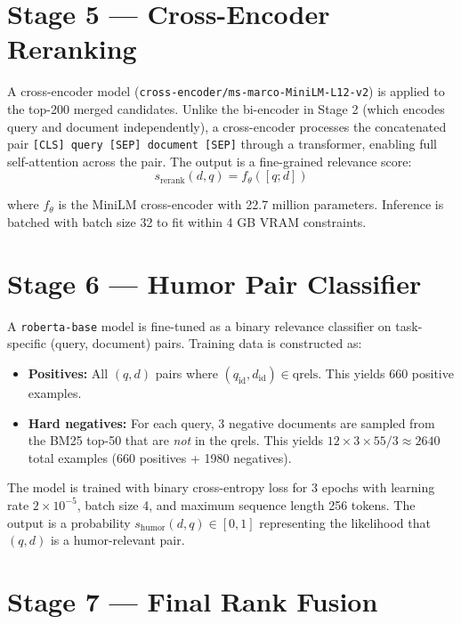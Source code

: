 \section{Stage 5 --- Cross-Encoder Reranking}

A cross-encoder model (\texttt{cross-encoder/ms-marco-MiniLM-L12-v2}) \cite{sbert} is applied to the top-200 merged candidates. Unlike the bi-encoder in Stage 2 (which encodes query and document independently), a cross-encoder processes the concatenated pair \texttt{[CLS] query [SEP] document [SEP]} through a transformer, enabling full self-attention across the pair. The output is a fine-grained relevance score:
\begin{equation}
s_{\text{rerank}}(d,q) = f_{\theta}([q; d])
\end{equation}

where $f_\theta$ is the MiniLM cross-encoder with 22.7 million parameters. Inference is batched with batch size 32 to fit within 4 GB VRAM constraints.

\section{Stage 6 --- Humor Pair Classifier}

A \texttt{roberta-base} model \cite{roberta} is fine-tuned as a binary relevance classifier on task-specific (query, document) pairs. Training data is constructed as:

\begin{itemize}
    \item \textbf{Positives:} All $(q, d)$ pairs where $(q_{\text{id}}, d_{\text{id}}) \in \text{qrels}$. This yields 660 positive examples.
    \item \textbf{Hard negatives:} For each query, 3 negative documents are sampled from the BM25 top-50 that are \textit{not} in the qrels. This yields $12 \times 3 \times 55/3 \approx 2640 $ total examples (660 positives + 1980 negatives).
\end{itemize}

The model is trained with binary cross-entropy loss for 3 epochs with learning rate $2 \times 10^{-5}$, batch size 4, and maximum sequence length 256 tokens. The output is a probability $s_{\text{humor}}(d,q) \in [0,1]$ representing the likelihood that $(q, d)$ is a humor-relevant pair.

\section{Stage 7 --- Final Rank Fusion}

